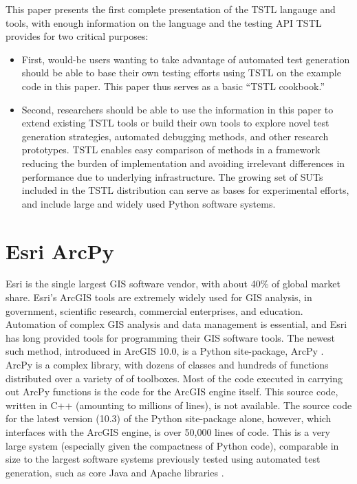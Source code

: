 This paper presents the first complete presentation of the TSTL
langauge and tools, with enough information on the language and the
testing API TSTL provides for two critical purposes:

\begin{itemize}
\item First, would-be users wanting to take advantage of automated
  test generation should be able to base their own testing
  efforts using TSTL on the example code in this paper.
  This paper thus serves as a basic ``TSTL cookbook.''

\item Second, researchers should be able to use the information in this paper to
  extend existing TSTL tools or build their own tools to explore novel
  test generation strategies, automated debugging methods, and other
  research prototypes.  TSTL enables easy comparison of
  methods in a framework reducing the burden of implementation
  and avoiding irrelevant differences in performance due to underlying
  infrastructure.  The growing set of SUTs
  included in the TSTL distribution can serve as bases for
  experimental efforts, and include large and widely used Python
  software systems.
\end{itemize}


\section{Esri ArcPy}


Esri is the single largest GIS software vendor, with about 40\% of
global market share.  Esri's ArcGIS tools are extremely widely used
for GIS analysis, in government, scientific research, commercial
enterprises, and education.  Automation of complex GIS analysis and
data management is essential, and Esri has long provided tools for
programming their GIS software tools.  The newest such method,
introduced in ArcGIS 10.0, is a Python site-package, ArcPy
\cite{ArcPy}.  ArcPy is a complex library, with dozens of classes and
hundreds of functions distributed over a variety of of toolboxes.
Most of the code executed in carrying out ArcPy functions is the code
for the ArcGIS engine itself.  This source code, written in C++
(amounting to millions of lines), is
not available.  The source code for the latest version (10.3) of the
Python site-package alone, however, which interfaces with the ArcGIS
engine, is over 50,000 lines of code.  This is a very large system
(especially given the compactness of Python code), comparable in size
to the largest software systems previously tested using automated test
generation, such as core Java and Apache libraries
\cite{FA11,Pacheco}.

